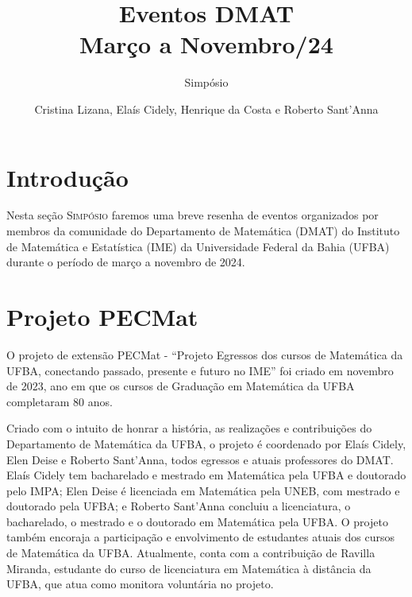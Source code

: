 \documentclass{hipatia}
\title{Eventos DMAT \\ Março a Novembro/24}
\subtitle{Simpósio}
\author{Cristina Lizana, Elaís Cidely, Henrique da Costa e Roberto Sant'Anna}
\newcommand{\superou}{\textsuperscript{\underline{o}}~}
\begin{document}
\setcounter{page}{\simposiopage}
\maketitle



\section{Introdução}

Nesta seção \textsc{Simpósio}  faremos uma breve resenha de eventos organizados por membros da comunidade do Departamento de Matemática (DMAT) do Instituto de Matemática e Estatística (IME) da Universidade Federal da Bahia (UFBA) durante o período de março a novembro de 2024. 


%
%

\section{Projeto PECMat}

O projeto de extensão PECMat - ``Projeto Egressos dos cursos de Matemática da UFBA, conectando passado, presente e futuro no IME'' foi criado em novembro de 2023, ano em que os cursos de Graduação em Matemática da UFBA completaram  80 anos.

Criado com o intuito de honrar a história, as  realizações e contribuições do Departamento de Matemática da UFBA, o projeto é coordenado por Elaís Cidely, Elen Deise e Roberto Sant'Anna, todos egressos e atuais professores do DMAT. Elaís Cidely tem bacharelado e mestrado em Matemática pela UFBA e doutorado pelo IMPA; Elen Deise é licenciada em Matemática pela UNEB, com mestrado e doutorado pela UFBA; e Roberto Sant'Anna concluiu a licenciatura, o bacharelado, o mestrado e o doutorado em Matemática pela UFBA. O projeto também encoraja a participação e envolvimento de estudantes atuais dos cursos de Matemática da UFBA. Atualmente, conta com a contribuição de Ravilla Miranda, estudante do curso de licenciatura em Matemática à distância da UFBA, que atua como monitora voluntária no projeto.
\end{document}
